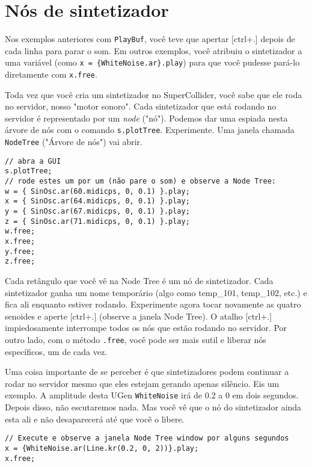 \section{Nós de sintetizador}

Nos exemplos anteriores com \texttt{PlayBuf}, você teve que apertar [ctrl+.] depois de cada linha para parar o som. Em outros exemplos, você atribuiu o sintetizador a uma variável (como \texttt{x = \{WhiteNoise.ar\}.play}) para que você pudesse pará-lo diretamente com \texttt{x.free}.

Toda vez que você cria um sintetizador no SuperCollider, você sabe que ele roda no servidor, nosso "motor sonoro". Cada sintetizador que está rodando no servidor é representado por um \emph{node} ("nó"). Podemos dar uma espiada nesta árvore de nós com o comando \texttt{s.plotTree}. Experimente. Uma janela chamada \texttt{NodeTree} ("Árvore de nós") vai abrir.

 
\begin{lstlisting}[style=SuperCollider-IDE, basicstyle=\scttfamily\footnotesize]
// abra a GUI
s.plotTree;
// rode estes um por um (não pare o som) e observe a Node Tree:
w = { SinOsc.ar(60.midicps, 0, 0.1) }.play;
x = { SinOsc.ar(64.midicps, 0, 0.1) }.play;
y = { SinOsc.ar(67.midicps, 0, 0.1) }.play;
z = { SinOsc.ar(71.midicps, 0, 0.1) }.play;
w.free;
x.free;
y.free;
z.free;
\end{lstlisting}
 

Cada retângulo que você vê na Node Tree é um nó de sintetizador. Cada sintetizador ganha um nome temporário (algo como temp\_101, temp\_102, etc.) e fica ali enquanto estiver rodando. Experimente agora tocar novamente as quatro senoides e aperte [ctrl+.] (observe a janela Node Tree). O atalho [ctrl+.] impiedosamente interrompe todos os nós que estão rodando no servidor. Por outro lado, com o método \texttt{.free}, você pode ser mais sutil e liberar nós específicos, um de cada vez.

Uma coisa importante de se perceber é que sintetizadores podem continuar a rodar no servidor mesmo que eles estejam gerando apenas silêncio. Eis um exemplo. A amplitude desta UGen \texttt{WhiteNoise} irá de 0.2 a 0 em dois segundos. Depois disso, não escutaremos nada. Mas você vê que o nó do sintetizador ainda esta ali e não desaparecerá até que você o libere.

 
\begin{lstlisting}[style=SuperCollider-IDE, basicstyle=\scttfamily\footnotesize]
// Execute e observe a janela Node Tree window por alguns segundos
x = {WhiteNoise.ar(Line.kr(0.2, 0, 2))}.play;
x.free;
\end{lstlisting}
 

